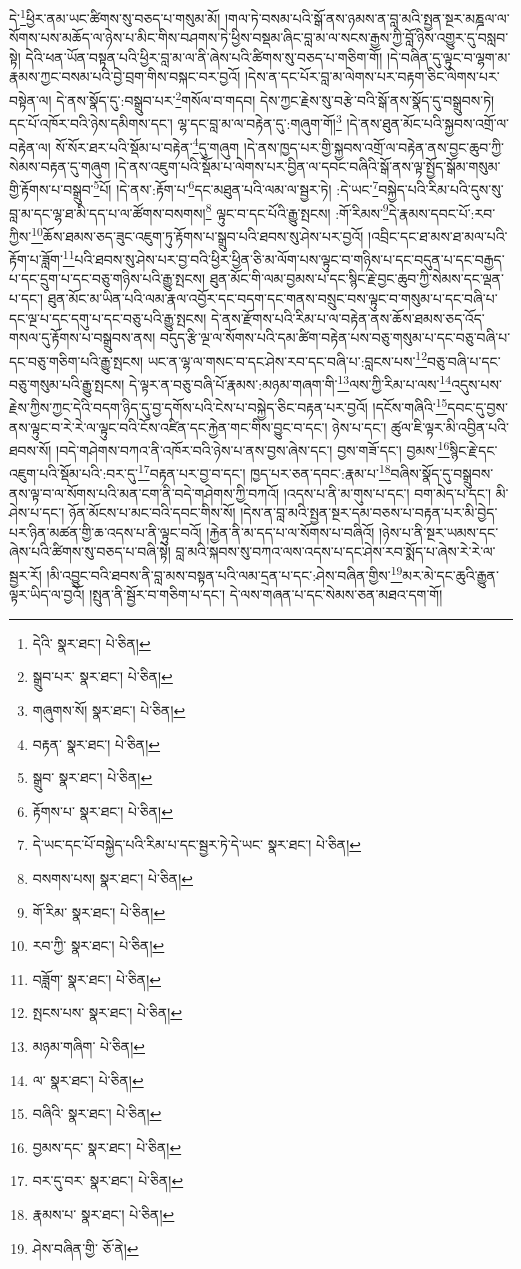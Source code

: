 དེ་\footnote{དེའི་  སྣར་ཐང་།  པེ་ཅིན། }ཕྱིར་ནམ་ཡང་ཚིགས་སུ་བཅད་པ་གསུམ་མོ། །གལ་ཏེ་བསམ་པའི་སྒོ་ནས་ཉམས་ན་བླ་མའི་སྤྱན་སྔར་མཎྜལ་ལ་སོགས་པས་མཆོད་ལ་ཉེས་པ་མིང་གིས་བཤགས་ཏེ་ཕྱིས་བསྡམ་ཞིང་བླ་མ་ལ་སངས་རྒྱས་ཀྱི་བློ་ཉིས་འགྱུར་དུ་བསླབ་སྟེ། དེའི་ཕན་ཡོན་བསྟན་པའི་ཕྱིར་བླ་མ་ལ་ནི་ཞེས་པའི་ཚིགས་སུ་བཅད་པ་གཅིག་གོ། །དེ་བཞིན་དུ་ལྟུང་བ་ལྷག་མ་རྣམས་ཀྱང་བསམ་པའི་བྱེ་བྲག་གིས་བསྐང་བར་བྱའོ། །དེས་ན་དང་པོར་བླ་མ་ལེགས་པར་བརྟག་ཅིང་ལེགས་པར་བསྟེན་ལ། དེ་ནས་སྣོད་དུ་:བསྒྲུབ་པར་\footnote{སྒྲུབ་པར་  སྣར་ཐང་།  པེ་ཅིན། }གསོལ་བ་གདབ། དེས་ཀྱང་རྗེས་སུ་བརྩེ་བའི་སྒོ་ནས་སྣོད་དུ་བསྒྲུབས་ཏེ། དང་པོ་འཁོར་བའི་ཉེས་དམིགས་དང་། ལྷ་དང་བླ་མ་ལ་བརྟེན་དུ་:གཞུག་གོ།\footnote{གཞུགས་སོ།  སྣར་ཐང་།  པེ་ཅིན། } །དེ་ནས་ཐུན་མོང་པའི་སྐྱབས་འགྲོ་ལ་བརྟེན་ལ། སོ་སོར་ཐར་པའི་སྡོམ་པ་བརྟེན་\footnote{བརྟན་  སྣར་ཐང་།  པེ་ཅིན། }དུ་གཞུག །དེ་ནས་ཁྱད་པར་གྱི་སྐྱབས་འགྲོ་ལ་བརྟེན་ནས་བྱང་ཆུབ་ཀྱི་སེམས་བརྟན་དུ་གཞུག །དེ་ནས་འཇུག་པའི་སྡོམ་པ་ལེགས་པར་བྱིན་ལ་དབང་བཞིའི་སྒོ་ནས་ལྟ་སྤྱོད་སྒོམ་གསུམ་གྱི་རྟོགས་པ་བསྒྲུབ་\footnote{སྒྲུབ་  སྣར་ཐང་།  པེ་ཅིན། }པོ། །དེ་ནས་:རྟོག་པ་\footnote{རྟོགས་པ་  སྣར་ཐང་།  པེ་ཅིན། }དང་མཐུན་པའི་ལམ་ལ་སྦྱར་ཏེ། :དེ་ཡང་\footnote{དེ་ཡང་དང་པོ་བསྐྱེད་པའི་རིམ་པ་དང་སྦྱར་ཏེ་དེ་ཡང་  སྣར་ཐང་།  པེ་ཅིན། }བསྐྱེད་པའི་རིམ་པའི་དུས་སུ་བླ་མ་དང་ལྷ་ཐ་མི་དད་པ་ལ་ཚོགས་བསགས།\footnote{བསགས་པས།  སྣར་ཐང་།  པེ་ཅིན། } ལྟུང་བ་དང་པོའི་རྒྱུ་སྤངས། :གོ་རིམས་\footnote{གོ་རིམ་  སྣར་ཐང་།  པེ་ཅིན། }དེ་རྣམས་དབང་པོ་:རབ་ཀྱིས་\footnote{རབ་ཀྱི་  སྣར་ཐང་།  པེ་ཅིན། }ཆོས་ཐམས་ཅད་ཟུང་འཇུག་ཏུ་རྟོགས་པ་སྒྲུབ་པའི་ཐབས་སུ་ཤེས་པར་བྱའོ། །འབྲིང་དང་ཐ་མས་ཐ་མལ་པའི་རྟོག་པ་ཟློག་\footnote{བཟློག་  སྣར་ཐང་།  པེ་ཅིན། }པའི་ཐབས་སུ་ཤེས་པར་བྱ་བའི་ཕྱིར་ཕྱིན་ཅི་མ་ལོག་པས་ལྟུང་བ་གཉིས་པ་དང་བདུན་པ་དང་བརྒྱད་པ་དང་དྲུག་པ་དང་བཅུ་གཉིས་པའི་རྒྱུ་སྤངས། ཐུན་མོང་གི་ལམ་བྱམས་པ་དང་སྙིང་རྗེ་བྱང་ཆུབ་ཀྱི་སེམས་དང་ལྡན་པ་དང་། ཐུན་མོང་མ་ཡིན་པའི་ལམ་རྣལ་འབྱོར་དང་བདག་དང་གནས་བསྲུང་བས་ལྟུང་བ་གསུམ་པ་དང་བཞི་པ་དང་ལྔ་པ་དང་དགུ་པ་དང་བཅུ་པའི་རྒྱུ་སྤངས། དེ་ནས་རྫོགས་པའི་རིམ་པ་ལ་བརྟེན་ནས་ཆོས་ཐམས་ཅད་འོད་གསལ་དུ་རྟོགས་པ་བསྒྲུབས་ནས། བདུད་རྩི་ལྔ་ལ་སོགས་པའི་དམ་ཚིག་བརྟེན་པས་བཅུ་གསུམ་པ་དང་བཅུ་བཞི་པ་དང་བཅུ་གཅིག་པའི་རྒྱུ་སྤངས། ཡང་ན་ལྷ་ལ་གསང་བ་དང་ཤེས་རབ་དང་བཞི་པ་:བླངས་པས་\footnote{སྤངས་པས་  སྣར་ཐང་།  པེ་ཅིན། }བཅུ་བཞི་པ་དང་བཅུ་གསུམ་པའི་རྒྱུ་སྤངས། དེ་ལྟར་ན་བཅུ་བཞི་པོ་རྣམས་:མཉམ་གཞག་གི་\footnote{མཉམ་གཞིག་  པེ་ཅིན། }ལས་ཀྱི་རིམ་པ་ལས་\footnote{ལ་  སྣར་ཐང་།  པེ་ཅིན། }འདུས་པས་རྗེས་ཀྱིས་ཀྱང་དེའི་བདག་ཉིད་དུ་བྱ་དགོས་པའི་ངེས་པ་བསྐྱེད་ཅིང་བརྟན་པར་བྱའོ། །དངོས་གཞིའི་\footnote{བཞིའི་  སྣར་ཐང་།  པེ་ཅིན། }དབང་དུ་བྱས་ནས་ལྟུང་བ་རེ་རེ་ལ་ལྟུང་བའི་ངོས་འཛིན་དང་རྐྱེན་གང་གིས་བྱུང་བ་དང་། ཉེས་པ་དང་། ཚུལ་ཇི་ལྟར་མི་འབྱིན་པའི་ཐབས་སོ། །བདེ་གཤེགས་བཀའ་ནི་འཁོར་བའི་ཉེས་པ་ནས་བྱས་ཞེས་དང་། བྱས་གཟོ་དང་། བྱམས་\footnote{བྱམས་དང་  སྣར་ཐང་།  པེ་ཅིན། }སྙིང་རྗེ་དང་འཇུག་པའི་སྡོམ་པའི་:བར་དུ་\footnote{བར་དུ་བར་  སྣར་ཐང་།  པེ་ཅིན། }བརྟན་པར་བྱ་བ་དང་། ཁྱད་པར་ཅན་དབང་:རྣམ་པ་\footnote{རྣམས་པ་  སྣར་ཐང་།  པེ་ཅིན། }བཞིས་སྣོད་དུ་བསྒྲུབས་ནས་ལྟ་བ་ལ་སོགས་པའི་མན་ངག་ནི་བདེ་གཤེགས་ཀྱི་བཀའོ། །འདས་པ་ནི་མ་གུས་པ་དང་། བག་མེད་པ་དང་། མི་ཤེས་པ་དང་། ཉོན་མོངས་པ་མང་བའི་དབང་གིས་སོ། །དེས་ན་བླ་མའི་སྤྱན་སྔར་དམ་བཅས་པ་བརྟན་པར་མི་བྱེད་པར་ཉིན་མཚན་གྱི་ཆ་འདས་པ་ནི་ལྟུང་བའོ། །རྐྱེན་ནི་མ་དད་པ་ལ་སོགས་པ་བཞིའོ། །ཉེས་པ་ནི་སྔར་ཡམས་དང་ཞེས་པའི་ཚིགས་སུ་བཅད་པ་བཞི་སྟེ། བླ་མའི་སྐབས་སུ་བཀའ་ལས་འདས་པ་དང་ཤེས་རབ་སྨོད་པ་ཞེས་རེ་རེ་ལ་སྦྱར་རོ། །མི་འབྱུང་བའི་ཐབས་ནི་བླ་མས་བསྟན་པའི་ལམ་དྲན་པ་དང་:ཤེས་བཞིན་གྱིས་\footnote{ཤེས་བཞིན་གྱི་  ཅོ་ནེ། }མར་མེ་དང་ཆུའི་རྒྱུན་ལྟར་ཡིད་ལ་བྱའོ། །སྤུན་ནི་སྦྱོར་བ་གཅིག་པ་དང་། དེ་ལས་གཞན་པ་དང་སེམས་ཅན་མཐའ་དག་གོ། 